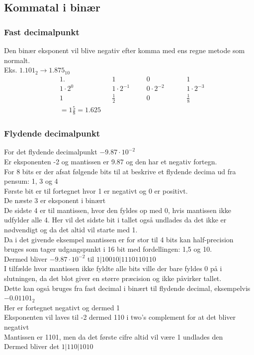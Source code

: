 \documentclass[12pt, a4paper]{article}
\begin{document}
			\subsection{Kommatal i binær}
				\subsubsection{Fast decimalpunkt}
					Den binær eksponent vil blive negativ efter komma med ens regne metode som normalt.\\
					Eks. $ 1.101_2 \rightarrow 1.875_{10}$ \\
					\begin{align*}
						&1.&&1&&&0&&&&1\\
						&1\cdot2^0&&1\cdot 2^{-1}&&&0\cdot 2^{-2}&&&&1\cdot 2^{-3}\\
						&1&&\frac{1}{2}&&&0&&&&\frac{1}{8}\\
						&=1\frac{5}{8}=1.625
					\end{align*}
				\subsubsection{Flydende decimalpunkt}
					For det flydende decimalpunkt $-9.87\cdot10^{-2}$\\
					Er eksponenten -2 og mantissen er 9.87 og den har et negativ fortegn.\\
					For 8 bits er der afsat følgende bits til at beskrive et flydende decima ud fra pensum: 1, 3 og 4\\
					Første bit er til fortegnet hvor 1 er negativt og 0 er positivt.\\
					De næste 3 er eksponent i binært\\
					De sidste 4 er til mantissen, hvor den fyldes op med 0, hvis mantissen ikke udfylder alle 4. Her vil det sidste bit i tallet også undlades da det ikke er nødvendigt og da det altid vil starte med 1.\\
					Da i det givende eksempel mantissen er for stor til 4 bits kan half-precision bruges som tager udgangspunkt i 16 bit med fordellingen: 1,5 og 10.\\
					Dermed bliver $-9.87\cdot 10^{-2}$ til $1|10010|1110110110$\\
					I tilfælde hvor mantissen ikke fyldte alle bits ville der bare fyldes 0 på i slutningen, da det blot giver en større præcision og ikke påvirker tallet.\\[8mm]
					Dette kan også bruges fra fast decimal i binært til flydende decimal, eksempelvis $-0.01101_2$\\
					Her er fortegnet negativt og dermed 1\\
					Eksponenten vil laves til -2 dermed 110 i two's complement for at det bliver negativt\\
					Mantissen er 1101, men da det første cifre altid vil være 1 undlades den\\
					Dermed bliver det $1|110|1010$
\end{document}

